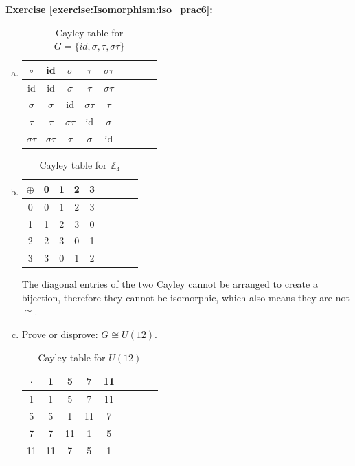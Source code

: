 \noindent\textbf{Exercise \ref{exercise:Isomorphism:iso_prac6}:}
\begin{enumerate}[(a)]
\item
\begin{table}[H]
\caption{Cayley table for $G =\{id, \sigma, \tau, \sigma\tau\}$}
{\small
\begin{center}
\begin{tabular}{c|cccccccc}
$\circ $ & id & $\sigma$ & $\tau$ & $\sigma\tau$  \\
\hline
id        & id & $\sigma$ & $\tau$  & $\sigma\tau$  \\
$\sigma$       & $\sigma$ & id & $\sigma\tau$ & $\tau$  \\
$\tau$      & $\tau$ & $\sigma\tau$ & id & $\sigma$ \\
$\sigma\tau$      & $\sigma\tau$  & $\tau$ & $\sigma$ & id \\
\end{tabular}
\end{center}
}
\end{table}

\item
\begin{table}[H]
\caption{Cayley table for ${\mathbb Z}_4$}
{\small
\begin{center}
\begin{tabular}{c|cccccccc}
$\oplus$ & 0 & 1 & 2 & 3  \\
\hline
0        & 0 & 1 & 2 & 3  \\
1       & 1 & 2 & 3 & 0  \\
2       & 2 & 3 & 0 & 1 \\
3       & 3 & 0 & 1 & 2 \\
\end{tabular}
\end{center}
}
\end{table}
The diagonal entries of the two Cayley cannot be arranged to create a bijection, therefore they cannot be isomorphic, which also means they are not $\cong$.

\item
Prove or disprove: $G \cong U(12)$.
\begin{table}[H]
\caption{Cayley table for $U(12)$}
{\small
\begin{center}
\begin{tabular}{c|cccccccc}
$\cdot$ & 1 & 5 & 7 & 11  \\
\hline
1        & 1 & 5 & 7 & 11  \\
5       & 5 & 1 & 11 & 7 \\
7       & 7 & 11 & 1 & 5  \\
11      & 11 & 7 & 5 & 1 \\
\end{tabular}
\end{center}
}
\end{table}
\end{enumerate}
